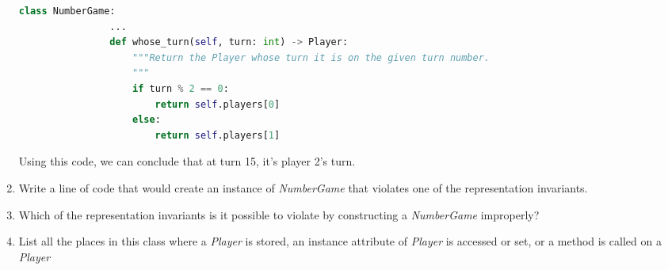 \documentclass[12pt]{article}
\begin{document}
\begin{enumerate}[1.]
\begin{mdframed}
\begin{mdframed}
            \bigskip

            \begin{lstlisting}[language=Python]
            class NumberGame:
                ...
                def whose_turn(self, turn: int) -> Player:
                    """Return the Player whose turn it is on the given turn number.
                    """
                    if turn % 2 == 0:
                        return self.players[0]
                    else:
                        return self.players[1]
            \end{lstlisting}

            \bigskip

            Using this code, we can conclude that at turn 15, it's player 2's turn.
        \end{mdframed}
    \end{mdframed}

    \item Write a line of code that would create an instance of \textit{NumberGame}
    that violates one of the representation invariants.
    \item Which of the representation invariants is it possible to violate by
    constructing a \textit{NumberGame} improperly?
    \item List all the places in this class where a \textit{Player} is stored, an instance
    attribute of \textit{Player} is accessed or set, or a method is called on a \textit{Player}
\end{enumerate}
\end{document}
